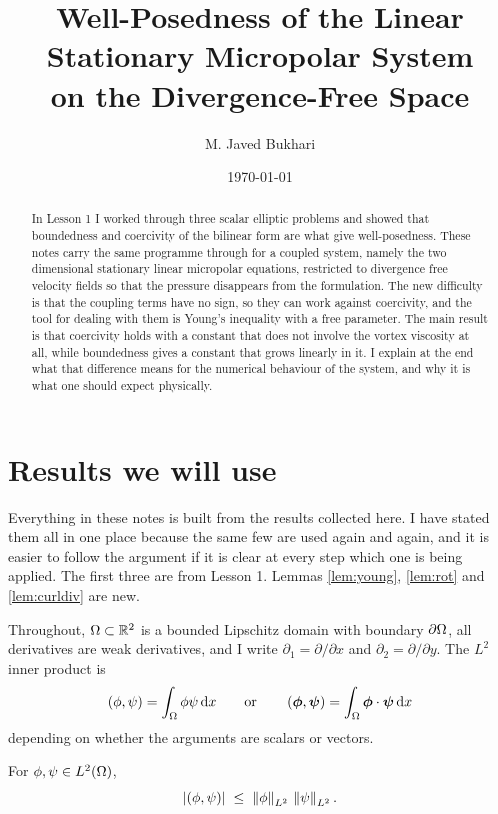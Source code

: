 \documentclass[11pt,a4paper]{article}
\title{Well-Posedness of the Linear Stationary Micropolar System\\
on the Divergence-Free Space}
\author{M. Javed Bukhari}
\date{\today}
\begin{document}
\maketitle

\begin{abstract}
In Lesson 1 I worked through three scalar elliptic problems and showed that
boundedness and coercivity of the bilinear form are what give well-posedness.
These notes carry the same programme through for a coupled system, namely the
two dimensional stationary linear micropolar equations, restricted to
divergence free velocity fields so that the pressure disappears from the
formulation. The new difficulty is that the coupling terms have no sign, so
they can work against coercivity, and the tool for dealing with them is Young's
inequality with a free parameter. The main result is that coercivity holds with
a constant that does not involve the vortex viscosity at all, while
boundedness gives a constant that grows linearly in it. I explain at the end
what that difference means for the numerical behaviour of the system, and why
it is what one should expect physically.
\end{abstract}

\tableofcontents

\section{Results we will use}

Everything in these notes is built from the results collected here. I have
stated them all in one place because the same few are used again and again, and
it is easier to follow the argument if it is clear at every step which one is
being applied. The first three are from Lesson 1. Lemmas
\ref{lem:young}, \ref{lem:rot} and \ref{lem:curldiv} are new.

Throughout, $\Omega \subset \mathbb{R}^{2}$ is a bounded Lipschitz domain with boundary
$\partial\Omega$, all derivatives are weak derivatives, and I write
$\partial_{1} = \partial/\partial x$ and $\partial_{2} = \partial/\partial y$.
The $L^{2}$ inner product is
\[
  \left( \phi , \psi \right) = \int_\Omega \phi \psi \,\mathrm{d}x
  \qquad \text{or} \qquad
  \left( \boldsymbol\phi , \boldsymbol\psi \right) = \int_\Omega \boldsymbol\phi \cdot \boldsymbol\psi \,\mathrm{d}x
\]
depending on whether the arguments are scalars or vectors.

\begin{lemma}\label{lem:cs}
For $\phi, \psi \in L^{2}(\Omega)$,
\[
  \left\lvert \left( \phi , \psi \right) \right\rvert \;\le\; \left\lVert \phi \right\rVert_{L^{2}}\,\left\lVert \psi \right\rVert_{L^{2}}.
\]
\end{lemma}
\end{document}
